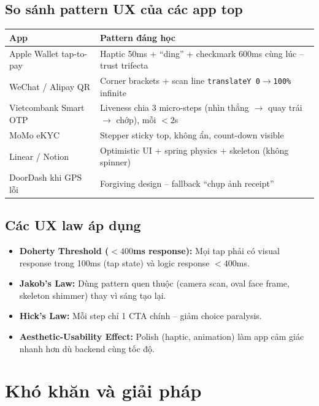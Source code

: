 \documentclass{article}
\begin{document}
\subsection{So sánh pattern UX của các app top}

\begin{tabularx}{\textwidth}{@{}l X@{}}
\toprule
\textbf{App} & \textbf{Pattern đáng học} \\
\midrule
Apple Wallet tap-to-pay & Haptic 50ms + ``ding'' + checkmark 600ms cùng lúc -- trust trifecta \\
\addlinespace
WeChat / Alipay QR & Corner brackets + scan line \texttt{translateY 0$\to$100\%} infinite \\
\addlinespace
Vietcombank Smart OTP & Liveness chia 3 micro-steps (nhìn thẳng $\to$ quay trái $\to$ chớp), mỗi $<2$s \\
\addlinespace
MoMo eKYC & Stepper sticky top, không ẩn, count-down visible \\
\addlinespace
Linear / Notion & Optimistic UI + spring physics + skeleton (không spinner) \\
\addlinespace
DoorDash khi GPS lỗi & Forgiving design -- fallback ``chụp ảnh receipt'' \\
\bottomrule
\end{tabularx}

\subsection{Các UX law áp dụng}

\begin{itemize}[leftmargin=1.5em]
  \item \textbf{Doherty Threshold ($<400$ms response):} Mọi tap phải có visual response trong 100ms (tap state) và logic response $<400$ms.
  \item \textbf{Jakob's Law:} Dùng pattern quen thuộc (camera scan, oval face frame, skeleton shimmer) thay vì sáng tạo lại.
  \item \textbf{Hick's Law:} Mỗi step chỉ 1 CTA chính -- giảm choice paralysis.
  \item \textbf{Aesthetic-Usability Effect:} Polish (haptic, animation) làm app cảm giác nhanh hơn dù backend cùng tốc độ.
\end{itemize}

\section{Khó khăn và giải pháp}
\end{document}
